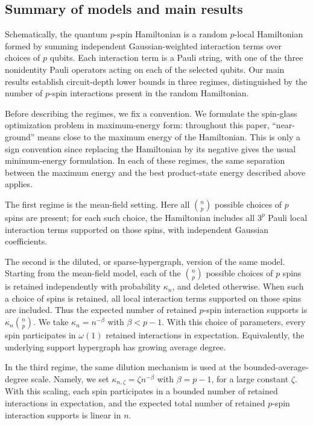 \documentclass[12pt]{article}
\begin{document}
\subsection{Summary of models and main results}

Schematically, the quantum \(p\)-spin Hamiltonian is a random \(p\)-local Hamiltonian formed by summing independent Gaussian-weighted interaction terms over choices of \(p\) qubits. Each interaction term is a Pauli string, with one of the three nonidentity Pauli operators acting on each of the selected qubits. Our main results establish circuit-depth lower bounds in three regimes, distinguished by the number of $p$-spin interactions present in the random Hamiltonian.

Before describing the regimes, we fix a convention. We formulate the spin-glass optimization problem in maximum-energy form: throughout this paper, ``near-ground'' means close to the maximum energy of the Hamiltonian. This is only a sign convention since replacing the Hamiltonian by its negative gives the usual minimum-energy formulation. In each of these regimes, the same separation between the maximum energy and the best product-state energy described above applies. 

The first regime is the mean-field setting. Here all
$\binom{n}{p}$ possible choices of $p$ spins are present; for each such choice, the Hamiltonian includes all $3^p$ Pauli local interaction terms supported on those spins, with independent Gaussian coefficients.

The second is the diluted, or sparse-hypergraph, version of the same model.
Starting from the mean-field model, each of the $\binom{n}{p}$ possible
choices of $p$ spins is retained independently with probability $\kappa_n$,
and deleted otherwise. When such a choice of spins is retained, all local
interaction terms supported on those spins are included. Thus the expected
number of retained $p$-spin interaction supports is
$\kappa_n\binom{n}{p}$. We take $\kappa_n=n^{-\beta}$ with $\beta<p-1$.
With this choice of parameters, every spin participates in $\omega(1)$
retained interactions in expectation. Equivalently, the underlying support
hypergraph has growing average degree.

In the third regime, the same dilution mechanism is used at the
bounded-average-degree scale. Namely, we set
$\kappa_{n,\zeta}=\zeta n^{-\beta}$ with $\beta=p-1$, for a large constant $\zeta$.
With this scaling, each spin participates in a bounded number of retained
interactions in expectation, and the expected total number of retained
$p$-spin interaction supports is linear in $n$.
\end{document}
